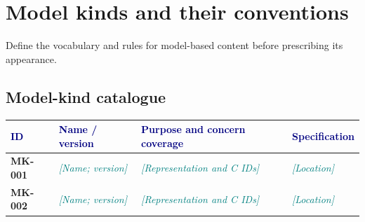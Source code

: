 \documentclass[11pt,letterpaper]{article}
\newcommand{\TemplatePageBreak}{\clearpage}
\newcommand{\FillIn}[1]{\textcolor{Teal}{\sffamily\itshape[#1]}}
\newcommand{\RecordID}[1]{\textsf{\textbf{#1}}}
\newcommand{\TableHead}[1]{\textcolor{Navy}{\sffamily\bfseries#1}}
\newcommand{\Lead}[1]{\textcolor{Muted}{#1}\par\vspace{3pt}}
\begin{document}
\TemplatePageBreak
\section{Model kinds and their conventions}
\Lead{Define the vocabulary and rules for model-based content before prescribing its appearance.}

\subsection{Model-kind catalogue}
{\small
\begin{tabularx}{\linewidth}{@{}L{0.68in}L{1.32in}Y L{1.0in}@{}}
\toprule
\TableHead{ID} & \TableHead{Name / version} & \TableHead{Purpose and concern coverage} & \TableHead{Specification}\\
\midrule
\RecordID{MK-001} & \FillIn{Name; version} & \FillIn{Representation and C IDs} & \FillIn{Location}\\
\RecordID{MK-002} & \FillIn{Name; version} & \FillIn{Representation and C IDs} & \FillIn{Location}\\
\bottomrule
\end{tabularx}}
\end{document}
